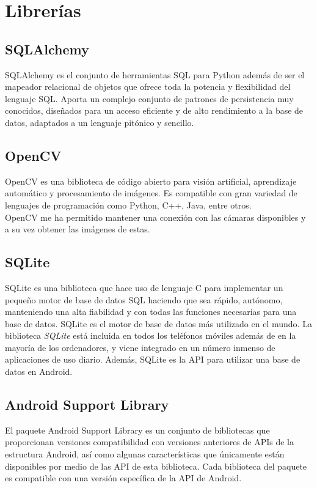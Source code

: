 \section{Librerías}

\subsection{SQLAlchemy}

SQLAlchemy es el conjunto de herramientas SQL para Python además de ser el mapeador relacional de objetos que ofrece toda la potencia y flexibilidad del lenguaje SQL. Aporta un complejo conjunto de patrones de persistencia muy conocidos, diseñados para un acceso eficiente y de alto rendimiento a la base de datos, adaptados a un lenguaje pitónico y sencillo.

\subsection{OpenCV}

OpenCV es una biblioteca de código abierto para visión artificial, aprendizaje automático y procesamiento de imágenes. Es compatible con gran variedad de lenguajes de programación como Python, C++, Java, entre otros.\\
OpenCV me ha permitido mantener una conexión con las cámaras disponibles y a su vez obtener las imágenes de estas.

\subsection{SQLite}

SQLite es una biblioteca que hace uso de lenguaje C para implementar un pequeño motor de base de datos SQL haciendo que sea rápido, autónomo, manteniendo una alta fiabilidad y con todas las funciones necesarias para una base de datos. SQLite es el motor de base de datos más utilizado en el mundo. La biblioteca \textit{SQLite} está incluida en todos los teléfonos móviles además de en la mayoría de los ordenadores, y viene integrado en un número inmenso de aplicaciones de uso diario. Además, SQLite es la API para utilizar una base de datos en Android.

\subsection{Android Support Library}

El paquete Android Support Library es un conjunto de bibliotecas que proporcionan versiones compatibilidad con versiones anteriores de APIs de la estructura Android, así como algunas características que únicamente están disponibles por medio de las API de esta biblioteca. Cada biblioteca del paquete es compatible con una versión específica de la API de Android.

